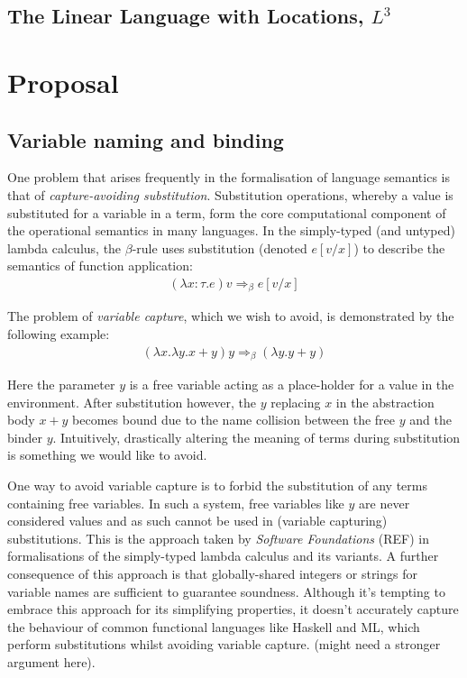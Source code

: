 \documentclass[]{unswthesis}
\begin{document}
\section{The Linear Language with Locations, $L^3$}

\chapter{Proposal}

\section{Variable naming and binding}

One problem that arises frequently in the formalisation of language semantics is that of \textit{capture-avoiding substitution}. Substitution operations, whereby a value is substituted for a variable in a term, form the core computational component of the operational semantics in many languages. In the simply-typed (and untyped) lambda calculus, the $\beta$-rule uses substitution (denoted $e[v/x]$) to describe the semantics of function application:
\begin{eqnarray*}
(\lambda x : \tau. e) v \Rightarrow_\beta e[v/x]
\end{eqnarray*}

The problem of \textit{variable capture}, which we wish to avoid, is demonstrated by the following example:
\begin{eqnarray*}
(\lambda x. \lambda y. x + y) y \Rightarrow_\beta (\lambda y. y + y)
\end{eqnarray*}

Here the parameter $y$ is a free variable acting as a place-holder for a value in the environment. After substitution however, the $y$ replacing $x$ in the abstraction body $x + y$ becomes bound due to the name collision between the free $y$ and the binder $y$. Intuitively, drastically altering the meaning of terms during substitution is something we would like to avoid.

One way to avoid variable capture is to forbid the substitution of any terms containing free variables. In such a system, free variables like $y$ are never considered values and as such cannot be used in (variable capturing) substitutions. This is the approach taken by \textit{Software Foundations} (REF) in formalisations of the simply-typed lambda calculus and its variants. A further consequence of this approach is that globally-shared integers or strings for variable names are sufficient to guarantee soundness. Although it's tempting to embrace this approach for its simplifying properties, it doesn't accurately capture the behaviour of common functional languages like Haskell and ML, which perform substitutions whilst avoiding variable capture. (might need a stronger argument here).
\end{document}
